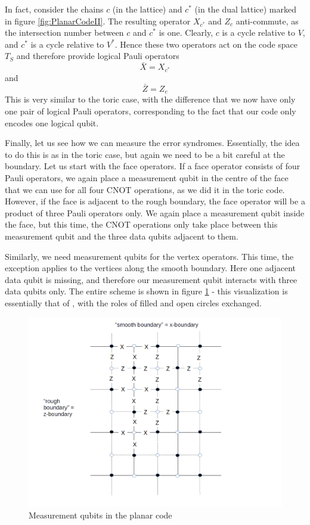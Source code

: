 \documentclass[a4paper, draft]{article}
\theoremstyle{own}
\theoremstyle{remark}
\begin{document}
In fact, consider the chains $c$ (in the lattice) and $c^*$ (in the dual lattice) marked in figure \ref{fig:PlanarCodeII}. The resulting operator $X_{c^*}$ and $Z_c$ anti-commute, as the intersection number between $c$ and $c^*$ is one. Clearly, $c$ is a cycle relative to $V$, and $c^*$ is a cycle relative to $V^*$. Hence these two operators act on the code space $T_S$ and therefore provide logical Pauli operators
$$
\bar{X} = X_{c^*}
$$
and
$$
\bar{Z} = Z_c
$$
This is very similar to the toric case, with the difference that we now have only one pair of logical Pauli operators, corresponding to the fact that our code only encodes one logical qubit.

Finally, let us see how we can measure the error syndromes. Essentially, the idea to do this is as in the toric case, but again we need to be a bit careful at the boundary. Let us start with the face operators. If a face operator consists of four Pauli operators, we again place a measurement qubit in the centre of the face that we can use for all four CNOT operations, as we did it in the toric code. However, if the face is adjacent to the rough boundary, the face operator will be a product of three Pauli operators only. We again place a measurement qubit inside the face, but this time, the CNOT operations only take place between this measurement qubit and the three data qubits adjacent to them. 

Similarly, we need measurement qubits for the vertex operators. This time, the exception applies to the vertices along the smooth boundary. Here one adjacent data qubit is missing, and therefore our measurement qubit interacts with three data qubits only. The entire scheme is shown in figure \ref{fig:PlanarCodeIII} - this visualization is essentially that of \cite{SurfaceCodes}, with the roles of filled and open circles exchanged. 

\begin{figure}[ht]
\centering
\includegraphics[width=0.7\linewidth]{images/PlanarCodeIII}
\caption[Measurement qubits in the planar code]{Measurement qubits in the planar code}
\label{fig:PlanarCodeIII}
\end{figure}
\end{document}
